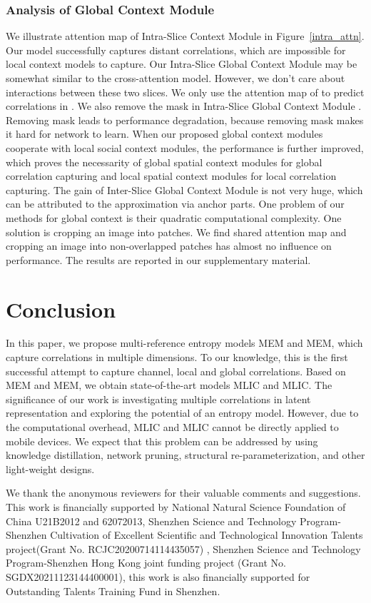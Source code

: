\documentclass[sigconf]{acmart}
\begin{document}
\subsubsection{Analysis of Global Context Module}
We illustrate attention map of Intra-Slice Context Module in Figure~\ref{intra_attn}.
Our model successfully captures distant correlations,
which are impossible for local context models to capture.
Our Intra-Slice Global Context Module may be somewhat similar to the cross-attention model.
However, we don't care about interactions between these two slices.
We only use the attention map of  to predict correlations in .
We also remove the mask in Intra-Slice Global Context Module .
Removing mask leads to performance degradation, because removing mask
makes it hard for network to learn.
When our proposed global context modules cooperate with local social context modules,
the performance is further improved, which proves the necessarity of
global spatial context modules for global correlation capturing and local spatial
context modules for local correlation capturing.
The gain of Inter-Slice Global Context Module is not very huge,
which can be attributed to the approximation via anchor parts.
One problem of our methods for global context is their quadratic computational complexity.
One solution is cropping an image into patches.
We find shared attention map and cropping an image into non-overlapped patches has almost no influence on performance.
The results are reported in our supplementary material.
\section{Conclusion}\label{Sec:conclusion}
In this paper, we propose multi-reference entropy models MEM and MEM,
which capture correlations in multiple dimensions. To our knowledge,
this is the first successful attempt to capture channel, local and global correlations.
Based on MEM and MEM, we obtain state-of-the-art models MLIC and MLIC.
The significance of our work is investigating multiple correlations
in latent representation and exploring the potential of an entropy model.
However, due to the computational overhead, MLIC and MLIC cannot be directly
applied to mobile devices. We expect that this problem can be addressed by
using knowledge distillation, network pruning, structural re-parameterization,
and other light-weight designs.
\begin{acks}
We thank the anonymous reviewers for their valuable comments and suggestions.
This work is financially supported by National Natural Science Foundation of China U21B2012 and  62072013, Shenzhen Science and Technology Program-Shenzhen Cultivation of Excellent Scientific and Technological Innovation Talents project(Grant No. RCJC20200714114435057) , Shenzhen Science and Technology Program-Shenzhen Hong Kong joint funding project (Grant No. SGDX20211123144400001), this work is also financially supported for Outstanding Talents Training Fund in Shenzhen.
\end{acks}
\end{document}
